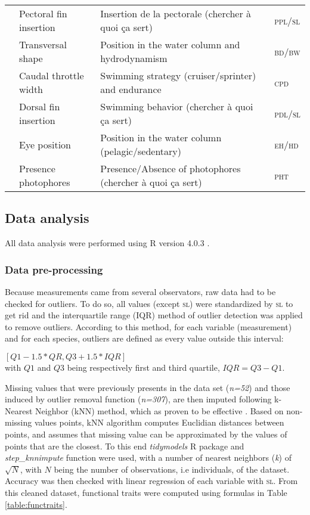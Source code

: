 \begin{sidewaystable}
\begin{tabular}{>{\bfseries}lll>{\scshape}l}
  &Pectoral fin insertion & Insertion de la pectorale (chercher à quoi ça sert) & ppl/sl \\ 
  &Transversal shape & Position in the water column and hydrodynamism & bd/bw \\ 
  &Caudal throttle width & Swimming strategy (cruiser/sprinter) and endurance & cpd \\ 
  &Dorsal fin insertion & Swimming behavior (chercher à quoi ça sert) & pdl/sl \\ 
  \hline
  \multirow{2}{*}{Habitat} &Eye position & Position in the water column (pelagic/sedentary) & eh/hd \\ 
  &Presence photophores & Presence/Absence of photophores (chercher à quoi ça sert) & pht \\ 
   \hline
\end{tabular}
\end{sidewaystable}

\subsection{Data analysis}
All data analysis were performed using \textsf{R} version 4.0.3 \citet{rcoreteam2021}.

\subsubsection{Data pre-processing}
Because measurements came from several observators, raw data had to be checked for outliers. To do so, all values (except \textsc{sl}) were standardized by \textsc{sl} to get rid and the interquartile range (IQR) method of outlier detection was applied to remove outliers. According to this method, for each variable (measurement) and for each species, outliers are defined as every value outside this interval: 
\begin{center}
$ [Q1 - 1.5*QR, Q3 + 1.5*IQR]$ \\
with $Q1$ and $Q3$ being respectively first and third quartile, $IQR = Q3 - Q1$. 
\end{center}{}


Missing values that were previously presents in the data set (\textit{n=52}) and those induced by outlier removal function (\textit{n=307}), are then imputed following k-Nearest Neighbor (kNN) method, which as proven to be effective \citep{zhang2012}. Based on non-missing values points, kNN algorithm computes Euclidian distances between points, and assumes that missing value can be approximated by the values of points that are the closest. To this end \emph{tidymodels} R package and \emph{step\_knnimpute} function \citep{kuhn2020} were used, with a number of nearest neighbors (\textit{k}) of $\sqrt{N}$, with $N$ being the number of observations, i.e individuals, of the dataset. Accuracy was then checked with linear regression of each variable with \textsc{sl}. From this cleaned dataset, functional traits were computed using formulas in Table \ref{table:functraits}. 

